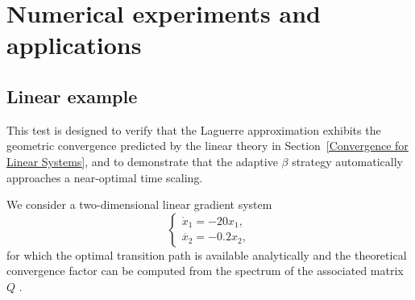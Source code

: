 \documentclass[a4paper,fleqn, 12pt]{cas-sc}
\numberwithin{table}{section}
\begin{document}


\section{Numerical experiments and applications}
\label{Numerical Experiments}




\subsection{Linear example}
This test is designed to verify that the Laguerre approximation exhibits the geometric convergence
predicted by the linear theory in Section~\ref{Convergence  for Linear Systems}, and to demonstrate
that the adaptive $\beta$ strategy automatically approaches a near-optimal time scaling.

We consider a two-dimensional linear gradient system
\begin{equation}\label{eq:exam-6.1}
    \left\{ \begin{array}{l}
		\dot{x}_1 = - 20 x_1 ,\\
		\dot{x_2} = - 0.2 x_2,
	\end{array} \right.
\end{equation}
    for which the optimal transition path is available analytically and the theoretical convergence factor
can be computed from the spectrum of the associated matrix $Q$ .
\end{document}
